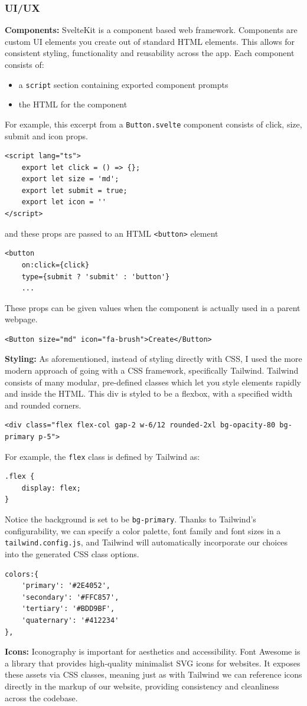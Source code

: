 \documentclass[12pt,a4paper]{article}
\begin{document}
\subsubsection{UI/UX}
\textbf{Components:} SvelteKit is a component based web framework. Components are custom UI elements you create out of standard HTML elements. This allows for consistent styling, functionality and reusability across the app. Each component consists of:
\begin{itemize}
    \item a \verb|script| section containing exported component prompts
    \item the HTML for the component
\end{itemize}
For example, this excerpt from a \verb|Button.svelte| component consists of click, size, submit and icon props. 
\begin{lstlisting}
<script lang="ts">
    export let click = () => {};
    export let size = 'md';
    export let submit = true;
    export let icon = ''
</script>
\end{lstlisting}
and these props are passed to an HTML \verb|<button>| element
\begin{lstlisting}
<button 
    on:click={click}
    type={submit ? 'submit' : 'button'}
    ...
\end{lstlisting}
These props can be given values when the component is actually used in a parent webpage.
\begin{lstlisting}
<Button size="md" icon="fa-brush">Create</Button>
\end{lstlisting}
\textbf{Styling:} As aforementioned, instead of styling directly with CSS, I used the more modern approach of going with a CSS framework, specifically Tailwind. Tailwind consists of many modular, pre-defined classes which let you style elements rapidly and inside the HTML. This div is styled to be a flexbox, with a specified width and rounded corners.
\begin{lstlisting}
<div class="flex flex-col gap-2 w-6/12 rounded-2xl bg-opacity-80 bg-primary p-5">
\end{lstlisting}
For example, the \verb|flex| class is defined by Tailwind as:
\begin{lstlisting}
.flex {
    display: flex;
}
\end{lstlisting}
Notice the background is set to be \verb|bg-primary|. Thanks to Tailwind's configurability, we can specify a color palette, font family and font sizes in a \verb|tailwind.config.js|, and Tailwind will automatically incorporate our choices into the generated CSS class options.
\begin{lstlisting}
colors:{
    'primary': '#2E4052',
    'secondary': '#FFC857',
    'tertiary': '#BDD9BF',
    'quaternary': '#412234'
},
\end{lstlisting}
\textbf{Icons:} Iconography is important for aesthetics and accessibility. Font Awesome is a library that provides high-quality minimalist SVG icons for websites. It exposes these assets via CSS classes, meaning just as with Tailwind we can reference icons directly in the markup of our website, providing consistency and cleanliness across the codebase. 
\end{document}
